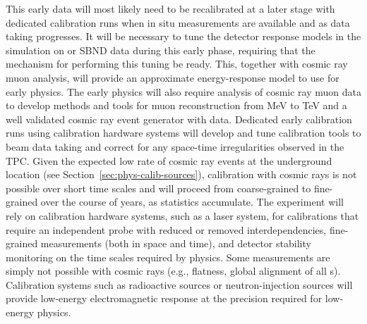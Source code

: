 This early data will most likely need to be recalibrated at a later stage with dedicated calibration runs when in situ measurements are available and as data taking progresses. It will be necessary to tune the detector response models in the simulation on  or SBND data during this early phase, requiring that the mechanism for performing this tuning be ready. 
This, together with cosmic ray muon analysis, will provide an approximate energy-response model to use for early physics. The early physics will also require analysis of cosmic ray muon data to develop methods and tools for muon reconstruction from MeV to TeV and a well validated cosmic ray event generator with data. 
Dedicated early calibration runs using calibration hardware systems will develop and tune calibration tools to beam data taking and correct for any space-time irregularities observed in the TPC. Given the expected low rate of cosmic ray events at the underground location (see Section~\ref{sec:phys-calib-sources}), calibration with cosmic rays is not possible over short time scales and will proceed from coarse-grained to fine-grained over the course of years, as statistics accumulate. 
The experiment will rely on calibration hardware systems, such as a laser system, for calibrations that require an independent probe with reduced or removed interdependencies, fine-grained measurements (both in space and time), and detector stability monitoring on the time scales required by physics. Some measurements are simply not possible with cosmic rays (e.g.,  flatness, global alignment of all s). Calibration systems such as radioactive sources or neutron-injection sources will provide low-energy electromagnetic response at the precision required for low-energy  physics. 

